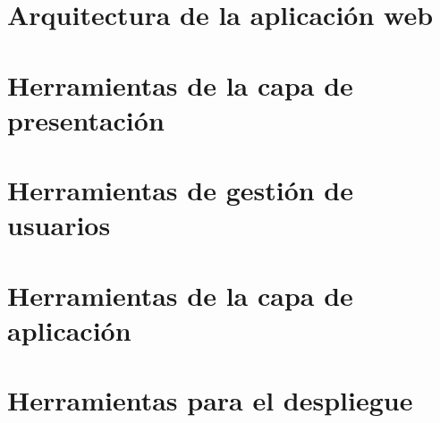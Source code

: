 \section{Arquitectura de la aplicaci\'on web}


\section{Herramientas de la capa de presentaci\'on}


\section{Herramientas de gesti\'on de usuarios}


\section{Herramientas de la capa de aplicaci\'on}


\section{Herramientas para el despliegue}

